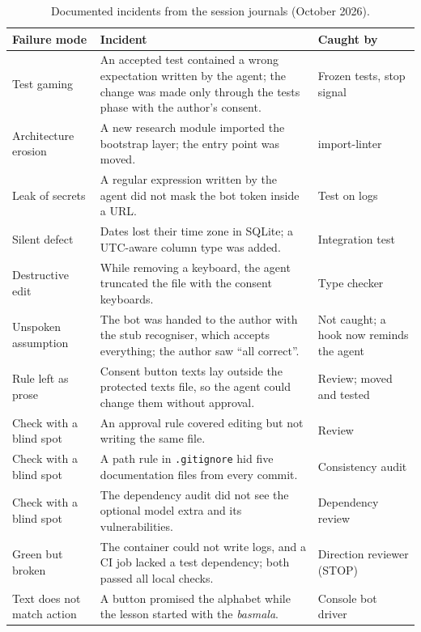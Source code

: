 \begin{table}[ht]
\centering\small
\caption{Documented incidents from the session journals (October 2026).}
\label{tab:incidents}
\begin{tabularx}{\linewidth}{@{}P{3.0cm}LP{2.6cm}@{}}
\toprule
Failure mode & Incident & Caught by \\
\midrule
Test gaming & An accepted test contained a wrong expectation written by the agent; the change was made
only through the tests phase with the author's consent. & Frozen tests, stop signal \\
Architecture erosion & A new research module imported the bootstrap layer; the entry point was moved. &
import-linter \\
Leak of secrets & A regular expression written by the agent did not mask the bot token inside a URL. & Test
on logs \\
Silent defect & Dates lost their time zone in SQLite; a UTC-aware column type was added. & Integration
test \\
Destructive edit & While removing a keyboard, the agent truncated the file with the consent keyboards. &
Type checker \\
Unspoken assumption & The bot was handed to the author with the stub recogniser, which accepts everything;
the author saw ``all correct''. & Not caught; a hook now reminds the agent \\
Rule left as prose & Consent button texts lay outside the protected texts file, so the agent could change
them without approval. & Review; moved and tested \\
Check with a blind spot & An approval rule covered editing but not writing the same file. & Review \\
Check with a blind spot & A path rule in \texttt{.gitignore} hid five documentation files from every
commit. & Consistency audit \\
Check with a blind spot & The dependency audit did not see the optional model extra and its
vulnerabilities. & Dependency review \\
Green but broken & The container could not write logs, and a CI job lacked a test dependency; both passed
all local checks. & Direction reviewer (STOP) \\
Text does not match action & A button promised the alphabet while the lesson started with the
\emph{basmala}. & Console bot driver \\
\bottomrule
\end{tabularx}
\end{table}

